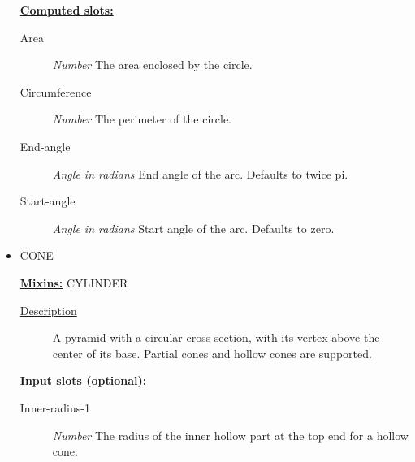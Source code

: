 \documentclass [11pt]{book}
\begin{document}
\begin{itemize}
\begin{description}
\end{description}








\textbf{
\underline{Computed slots:}}

\begin{description}

\item [Area]
\emph{Number} The area enclosed by the circle.


\item [Circumference]
\emph{Number} The perimeter of the circle.


\item [End-angle]
\emph{Angle in radians} End angle of the arc. Defaults to twice pi.


\item [Start-angle]
\emph{Angle in radians} Start angle of the arc. Defaults to zero.


\end{description}







\item {}CONE


\textbf{
\underline{Mixins:}} CYLINDER





\begin{description}

\item [
\underline{Description}]


A pyramid with a circular cross section, with its vertex above 
the center of its base. Partial cones and hollow cones are supported.



\end{description}








\textbf{
\underline{Input slots (optional):}}

\begin{description}

\item [Inner-radius-1]
\emph{Number} The radius of the inner hollow part at the top end for a hollow cone.



\end{description}
\end{itemize}
\end{document}
